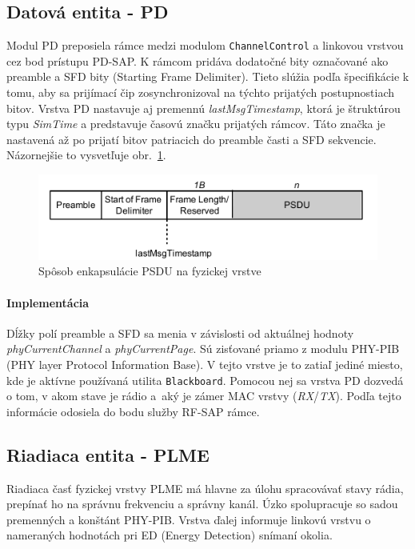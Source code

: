\subsection{Datová entita - PD}
\indent\indent Modul PD preposiela rámce medzi modulom \texttt{ChannelControl} a linkovou vrstvou cez bod prístupu PD-SAP. K rámcom pridáva dodatočné bity označované ako preamble a SFD bity (Starting Frame Delimiter). Tieto slúžia podľa špecifikácie k tomu, aby sa prijímací čip zosynchronizoval na týchto prijatých postupnostiach bitov. Vrstva PD nastavuje aj premennú \textit{lastMsgTimestamp}, ktorá je štruktúrou typu \textit{SimTime} a predstavuje časovú značku prijatých rámcov. Táto značka je nastavená až po prijatí bitov patriacich do preamble časti a SFD sekvencie. Názornejšie to vysvetľuje obr.~\ref{fig:frame_phy}.
\begin{figure}[htbp]
\begin{center}
\includegraphics[width=140mm]{figures/frame_phy}
\caption{Spôsob enkapsulácie PSDU na fyzickej vrstve}
\label{fig:frame_phy}
\end{center}
\end{figure}
\paragraph{Implementácia}
Dĺžky polí preamble a SFD sa menia v závislosti od aktuálnej hodnoty \textit{phyCurrentChannel} a \textit{phyCurrentPage}. Sú zisťované priamo z modulu PHY-PIB (PHY layer Protocol Information Base). V tejto vrstve je to zatiaľ jediné miesto, kde je aktívne používaná utilita \texttt{Blackboard}. Pomocou nej sa vrstva PD dozvedá o tom, v akom stave je rádio a~aký je zámer MAC vrstvy (\textit{RX}/\textit{TX}). Podľa tejto informácie odosiela do bodu služby RF-SAP rámce.\\
\subsection{Riadiaca entita - PLME}
\indent\indent Riadiaca časť fyzickej vrstvy PLME má hlavne za úlohu spracovávať stavy rádia, prepínať ho na správnu frekvenciu a správny kanál. Úzko spolupracuje so sadou premenných a konštánt PHY-PIB. Vrstva ďalej informuje linkovú vrstvu o nameraných hodnotách pri ED (Energy Detection) snímaní okolia.\\
